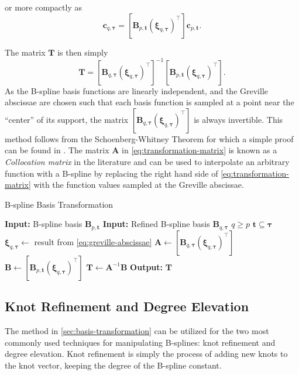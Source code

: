 or more compactly as
\begin{equation}
    [\mathbf B_{q,\boldsymbol \tau}(\boldsymbol \xi_{q,\boldsymbol \tau})^\top] \mathbf c_{q, \boldsymbol \tau} = [\mathbf B_{p,\mathbf t}(\boldsymbol \xi_{q,\boldsymbol \tau})^\top] \mathbf c_{p, \mathbf t}.
\end{equation}

The matrix $\mathbf T$ is then simply
\begin{equation}\label{eq:transformation-matrix-solution}
    \mathbf T = [\mathbf B_{q,\boldsymbol \tau}(\boldsymbol \xi_{q,\boldsymbol \tau})^\top]^{-1} [\mathbf B_{p,\mathbf t}(\boldsymbol \xi_{q,\boldsymbol \tau})^{\top}].
\end{equation}
As the B-spline basis functions are linearly independent, and the Greville abscissae are chosen such that each basis function is sampled at a point near the ``center'' of its support, the matrix $[\mathbf B_{q,\boldsymbol \tau}(\boldsymbol \xi_{q,\boldsymbol \tau})^\top]$ is always invertible. This method follows from the Schoenberg-Whitney Theorem \citep{schoenberg1988polya} for which a simple proof can be found in \cite{schoenberg2022proof}. The matrix $\mathbf A$ in \cref{eq:transformation-matrix} is known as a \emph{Collocation matrix} in the literature  and can be used to interpolate an arbitrary function with a B-spline by replacing the right hand side of \cref{eq:transformation-matrix} with the function values sampled at the Greville abscissae.

\begin{algorithm}
    \caption{B-spline Basis Transformation}\label{alg:basis-transformation}
    \begin{algorithmic}[1]
        \State \textbf{Input:} B-spline basis $\mathbf{B}_{p,\mathbf{t}}$
        \State \textbf{Input:} Refined B-spline basis $\mathbf B_{q,\boldsymbol \tau}$
        \Ensure $q \geq p$
        \Ensure $\mathbf t \subseteq \boldsymbol \tau$
        \State $\boldsymbol \xi_{q, \boldsymbol \tau} \gets$ result from \cref{eq:greville-abscissae}
        \State $\mathbf A \gets [\mathbf B_{q,\boldsymbol \tau}(\boldsymbol \xi_{q,\boldsymbol \tau})^\top]$
        \State $\mathbf B \gets [\mathbf B_{p,\mathbf t}(\boldsymbol \xi_{q,\boldsymbol \tau})^\top]$
        \State $\mathbf T \gets \mathbf A^{-1} \mathbf B$
        \State \textbf{Output:} $\mathbf T$
    \end{algorithmic}
\end{algorithm}

\subsection{Knot Refinement and Degree Elevation}\label{sec:knot-refinement-degree-elevation}
The method in \cref{sec:basis-transformation} can be utilized for the two most commonly used techniques for manipulating B-splines: knot refinement and degree elevation. Knot refinement is simply the process of adding new knots to the knot vector, keeping the degree of the B-spline constant. 

